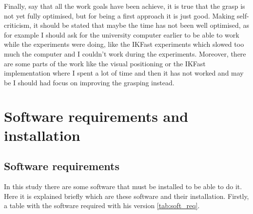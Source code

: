 \documentclass[12pt,a4paper,final,twoside,openright]{report}
\renewcommand{\thefigure}{\arabic{chapter}.\arabic{figure}}
\renewcommand{\thetable}{\arabic{chapter}.\arabic{table}}
\renewcommand{\theequation}{\arabic{chapter}.\arabic{equation}}
\renewcommand{\thefootnote}{\arabic{footnote}}
\begin{document}
Finally, say that all the work goals have been achieve, it is true that the grasp is not yet fully optimised, but for being a first approach it is just good. Making self-criticism, it should be stated that maybe the time has not been well optimised, as for example I should ask for the university computer earlier to be able to work while the experiments were doing, like the IKFast experiments which slowed too much the computer and I couldn't work during the experiments. Moreover, there are some parts of the work like the visual positioning or the IKFast implementation where I spent a lot of time and then it has not worked and may be I should had focus on improving the grasping instead.

%
\printbibliography
{}
\label{cha:references}

\appendix
\clearpage %
\addappheadtotoc
\appendixpage

\renewcommand{\thefigure}{\thechapter.\arabic{figure}}
\renewcommand{\thetable}{\thechapter.\arabic{table}}
\renewcommand{\theequation}{\thechapter.\arabic{equation}}
\renewcommand{\thefootnote}{\arabic{footnote}}

%
\chapter{Software requirements and installation}
\section{Software requirements}

In this study there are some software that must be installed to be able to do it. Here it is explained briefly which are these software and their installation. Firstly, a table with the software required with his version \ref{tab:soft_req}.
\end{document}
